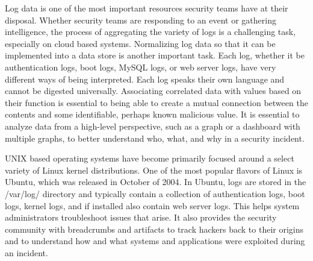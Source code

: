 \documentclass[./main.tex]{subfiles}
\begin{document}
Log data is one of the most important resources security teams have at their disposal. Whether security teams are responding to an event or gathering intelligence, the process of aggregating the variety of logs is a challenging task, especially on cloud based systems. Normalizing log data so that it can be implemented into a data store is another important task. Each log, whether it be authentication logs, boot logs, MySQL logs, or web server logs, have very different ways of being interpreted. Each log speaks their own language and cannot be digested universally. Associating correlated data with values based on their function is essential to being able to create a mutual connection between the contents and some identifiable, perhaps known malicious value. It is essential to analyze data from a high-level perspective, such as a graph or a dashboard with multiple graphs, to better understand who, what, and why in a security incident.

UNIX based operating systems have become primarily focused around a select variety of Linux kernel distributions. One of the most popular flavors of Linux is Ubuntu, which was released in October of 2004. In Ubuntu, logs are stored in the /var/log/ directory and typically contain a collection of authentication logs, boot logs, kernel logs, and if installed also contain web server logs. This helps system administrators troubleshoot issues that arise. It also provides the security community with breadcrumbs and artifacts to track hackers back to their origins and to understand how and what systems and applications were exploited during an incident.
\end{document}
